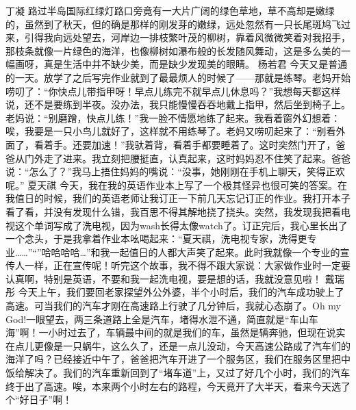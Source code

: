 {}\markdownRendererInterblockSeparator
{}丁凝\markdownRendererInterblockSeparator
{}路过半岛国际红绿灯路口旁竟有一大片广阔的绿色草地，草不高却是嫩绿的，虽然到了秋天，但的确是那样的刚发芽的嫩绿，远处忽然有一只长尾斑鸠飞过来，引得我向远处望去，河岸边一排枝繁叶茂的柳树，靠着风微微笑着对我招手，那枝条就像一片绿色的海洋，也像柳树如瀑布般的长发随风舞动，这是多么美的一幅画呀，真是生活中并不缺少美，而是缺少发现美的眼睛。\markdownRendererInterblockSeparator
{}\markdownRendererInterblockSeparator
{}杨若君\markdownRendererInterblockSeparator
{}今天又是普通的一天。放学了之后写完作业就到了最最烦人的时候了——那就是练琴。老妈开始唠叨了：“你快点儿带指甲呀！早点儿练完不就早点儿休息吗？”我想每天都这样说，还不是要练到半夜。没办法，我只能慢慢吞吞地戴上指甲，然后坐到椅子上。老妈说：“别磨蹭，快点儿练！”我一脸不情愿地练了起来。我看着窗外幻想着：唉，我要是一只小鸟儿就好了，这样就不用练琴了。老妈又唠叨起来了：“别看外面了，看着手。还要加速！”我驮着背，看着手都要睡着了。这时突然门开了，爸爸从门外走了进来。我立刻把腰挺直，认真起来，这时妈妈忍不住笑了起来。爸爸说：“怎么了？”我马上捂住妈妈的嘴说：“没事，她刚刚在手机上聊天，笑得正欢呢。”\markdownRendererInterblockSeparator
{}\markdownRendererInterblockSeparator
{}夏天祺\markdownRendererInterblockSeparator
{}今天，我在我的英语作业本上写了一个极其怪异也很可笑的答案。在我值日的时候，我们的英语老师让我订正一下前几天忘记订正的作业。我打开本子看了看，并没有发现什么错，我百思不得其解地挠了挠头。突然，我发现我把看电视这个单词写成了洗电视，因为wash长得太像watch了。订正完后，我心里长出了一个念头，于是我拿着作业本吆喝起来：“夏天祺，洗电视专家，洗得更专业……”“”哈哈哈哈…”和我一起值日的人都大声笑了起来。此时我就像一个专业的宣传人一样，正在宣传呢！听完这个故事，我不得不跟大家说：大家做作业时一定要认真啊，特别是英语，不要和我一起洗电视，要是想的话，我就没意见啦！\markdownRendererInterblockSeparator
{}\markdownRendererInterblockSeparator
{}戴瑞彤\markdownRendererInterblockSeparator
{}今天上午，我们要回老家探望外公外婆，半个小时后，我们的汽车成功驶上了高速。可当我们的汽车才刚在高速路上行驶了几分钟后，我就心态崩了。Oh my God!一眼望去，两三条道路上全是汽车，堵得水泄不通，简直就是“车山车海”啊！一小时过去了，车辆最中间的就是我们的车，虽然是辆奔驰，但现在说实在点儿更像是一只蜗牛，这么久了，还是一点儿没动，今天高速公路成了汽车们的海洋了吗？已经接近中午了，爸爸把汽车开进了一个服务区，我们在服务区里把中饭给解决了。我们的汽车重新回到了“堵车道”上，又过了好几个小时，我们的汽车终于出了高速。唉，本来两个小时左右的路程，今天竟开了大半天，看来今天选了个“好日子”啊！\markdownRendererInterblockSeparator
